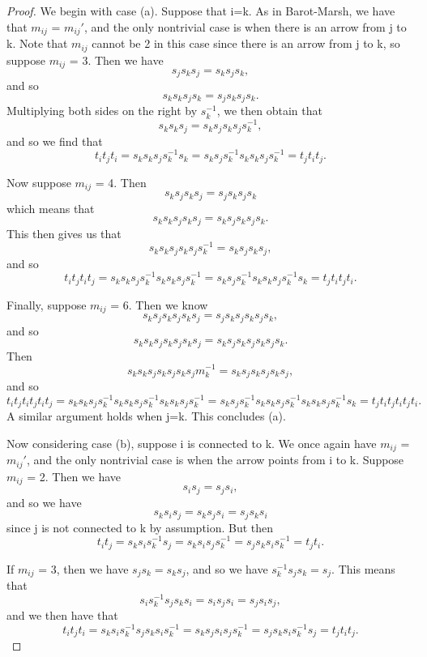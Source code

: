 \documentclass[11pt]{amsart}
\theoremstyle{definition}
\begin{document}
\begin{proof}
We begin with case (a). Suppose that i=k. As in Barot-Marsh, we have that $m_{ij}$ = $m_{ij}'$, and the only nontrivial case is when there is an arrow from j to k. Note that $m_{ij}$ cannot be 2 in this case since there is an arrow from j to k, so suppose $m_{ij}$ = 3. Then we have $$s_{j}s_{k}s_{j} = s_{k}s_{j}s_{k},$$ and so $$s_{k}s_{k}s_{j}s_{k} = s_{j}s_{k}s_{j}s_{k}.$$ Multiplying both sides on the right by $s_{k}^{-1}$, we then obtain that $$s_{k}s_{k}s_{j} = s_{k}s_{j}s_{k}s_{j}s_{k}^{-1},$$ and so we find that $$t_{i}t_{j}t_{i} = s_{k}s_{k}s_{j}s_{k}^{-1}s_{k} = s_{k}s_{j}s_{k}^{-1}s_{k}s_{k}s_{j}s_{k}^{-1} = t_{j}t_{i}t_{j}.$$

Now suppose $m_{ij}$ = 4. Then $$s_{k}s_{j}s_{k}s_{j} = s_{j}s_{k}s_{j}s_{k}$$ which means that $$s_{k}s_{k}s_{j}s_{k}s_{j} = s_{k}s_{j}s_{k}s_{j}s_{k}.$$ This then gives us that $$s_{k}s_{k}s_{j}s_{k}s_{j}s_{k}^{-1} = s_{k}s_{j}s_{k}s_{j},$$ and so $$t_{i}t_{j}t_{i}t_{j} = s_{k}s_{k}s_{j}s_{k}^{-1}s_{k}s_{k}s_{j}s_{k}^{-1} = s_{k}s_{j}s_{k}^{-1}s_{k}s_{k}s_{j}s_{k}^{-1}s_{k} = t_{j}t_{i}t_{j}t_{i}.$$

Finally, suppose $m_{ij}$ = 6. Then we know $$s_{k}s_{j}s_{k}s_{j}s_{k}s_{j} = s_{j}s_{k}s_{j}s_{k}s_{j}s_{k},$$ and so $$s_{k}s_{k}s_{j}s_{k}s_{j}s_{k}s_{j} = s_{k}s_{j}s_{k}s_{j}s_{k}s_{j}s_{k}.$$ Then $$s_{k}s_{k}s_{j}s_{k}s_{j}s_{k}s_{j}m_{k}^{-1} = s_{k}s_{j}s_{k}s_{j}s_{k}s_{j},$$ and so $$t_{i}t_{j}t_{i}t_{j}t_{i}t_{j} = s_{k}s_{k}s_{j}s_{k}^{-1}s_{k}s_{k}s_{j}s_{k}^{-1}s_{k}s_{k}s_{j}s_{k}^{-1} = s_{k}s_{j}s_{k}^{-1}s_{k}s_{k}s_{j}s_{k}^{-1}s_{k}s_{k}s_{j}s_{k}^{-1}s_{k} = t_{j}t_{i}t_{j}t_{i}t_{j}t_{i}.$$ A similar argument holds when j=k. This concludes (a).

Now considering case (b), suppose i is connected to k. We once again have $m_{ij}$ = $m_{ij}'$, and the only nontrivial case is when the arrow points from i to k. Suppose $m_{ij}$ = 2. Then we have $$s_{i}s_{j} = s_{j}s_{i},$$ and so we have $$s_{k}s_{i}s_{j} = s_{k}s_{j}s_{i} = s_{j}s_{k}s_{i}$$ since j is not connected to k by assumption. But then $$t_{i}t_{j} = s_{k}s_{i}s_{k}^{-1}s_{j} = s_{k}s_{i}s_{j}s_{k}^{-1} = s_{j}s_{k}s_{i}s_{k}^{-1} = t_{j}t_{i}.$$

If $m_{ij}$ = 3, then we have $s_{j}s_{k} = s_{k}s_{j}$, and so we have $s_{k}^{-1}s_{j}s_{k} = s_{j}.$ This means that $$s_{i}s_{k}^{-1}s_{j}s_{k}s_{i} = s_{i}s_{j}s_{i} = s_{j}s_{i}s_{j},$$ and we then have that $$t_{i}t_{j}t_{i} = s_{k}s_{i}s_{k}^{-1}s_{j}s_{k}s_{i}s_{k}^{-1} = s_{k}s_{j}s_{i}s_{j}s_{k}^{-1} = s_{j}s_{k}s_{i}s_{k}^{-1}s_{j} = t_{j}t_{i}t_{j}.$$


\end{proof}
\end{document}
